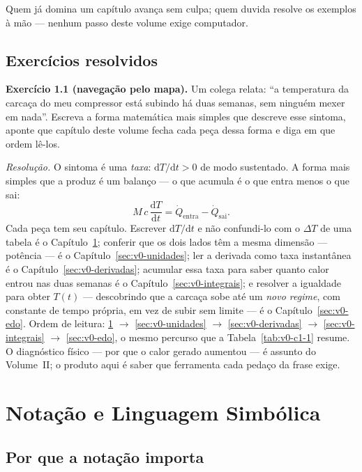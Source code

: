\documentclass[12pt,a4paper]{article}
\numberwithin{equation}{section}
\numberwithin{table}{section}
\numberwithin{figure}{section}
\begin{document}
Quem já domina um capítulo avança sem culpa; quem duvida resolve os exemplos
à mão --- nenhum passo deste volume exige computador.

\subsection{Exercícios resolvidos}

\textbf{Exercício 1.1 (navegação pelo mapa).} Um colega relata: ``a
temperatura da carcaça do meu compressor está subindo há duas semanas, sem
ninguém mexer em nada''. Escreva a forma matemática mais simples que
descreve esse sintoma, aponte que capítulo deste volume fecha cada peça
dessa forma e diga em que ordem lê-los.

\emph{Resolução.} O sintoma é uma \emph{taxa}: $\mathrm{d}T/\mathrm{d}t
> 0$ de modo sustentado. A forma mais simples que a produz é um balanço
--- o que acumula é o que entra menos o que sai:
$$M\,c\,\frac{\mathrm{d}T}{\mathrm{d}t}
  = \dot{Q}_{\mathrm{entra}} - \dot{Q}_{\mathrm{sai}}.$$
Cada peça tem seu capítulo. Escrever $\mathrm{d}T/\mathrm{d}t$ e não
confundi-lo com o $\Delta T$ de uma tabela é o
Capítulo~\ref{sec:v0-notacao}; conferir que os dois lados têm a mesma
dimensão --- potência --- é o Capítulo~\ref{sec:v0-unidades}; ler a
derivada como taxa instantânea é o Capítulo~\ref{sec:v0-derivadas};
acumular essa taxa para saber quanto calor entrou nas duas semanas é o
Capítulo~\ref{sec:v0-integrais}; e resolver a igualdade para obter
$T(t)$ --- descobrindo que a carcaça sobe até um \emph{novo regime}, com
constante de tempo própria, em vez de subir sem limite --- é o
Capítulo~\ref{sec:v0-edo}. Ordem de leitura:
\ref{sec:v0-notacao} $\rightarrow$
\ref{sec:v0-unidades} $\rightarrow$ \ref{sec:v0-derivadas} $\rightarrow$
\ref{sec:v0-integrais} $\rightarrow$ \ref{sec:v0-edo}, o mesmo percurso
que a Tabela~\ref{tab:v0-c1-1} resume. O diagnóstico físico --- por que
o calor gerado aumentou --- é assunto do Volume~II; o produto aqui é
saber que ferramenta cada pedaço da frase exige.


\clearpage
\section{Notação e Linguagem Simbólica}\label{sec:v0-notacao}

\subsection{Por que a notação importa}
\end{document}
